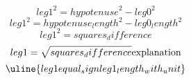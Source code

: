 \[ {leg1}^{2}={hypotenuse}^{2}-{leg0}^{2} \]
\[ {leg1}^{2}={hypotenuse_length}^{2}-{leg0_length}^{2} \]
\[ {leg1}^{2}={squares_difference} \]
\[ {leg1}=\sqrt{\mathstrut {squares_difference}}\text{{explanation}}\]
\[ \uline{{leg1}{equal_sign}{leg1_length_with_unit}}\]